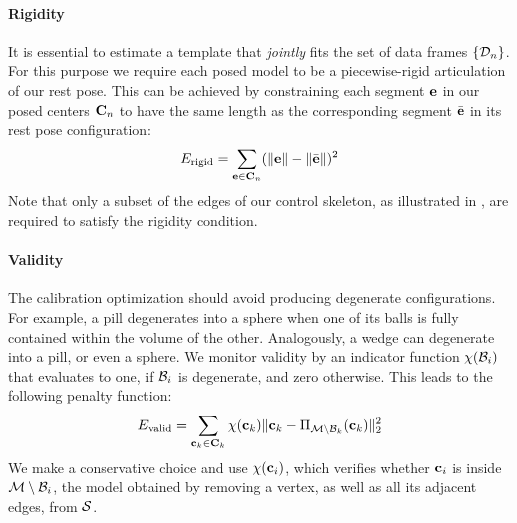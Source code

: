 \paragraph{Rigidity}
It is essential to estimate a template that \emph{jointly} fits the set of data frames $\{ \mathcal{D}_n \}$. For this purpose we require each posed model to be a piecewise-rigid articulation of our rest pose. This can be achieved by constraining each segment $\mathbf{e}$ in our posed centers ${\mathbf{C}}_n$ to have the same length as the corresponding segment $\bar{\mathbf{e}}$ in its rest pose configuration:
% 
\begin{equation}
E_{\text{rigid}} = \sum_{\mathbf{e} \in {\mathbf{C}}_n} (\| \mathbf{e} \| - \| \bar{\mathbf{e}} \|)^2
\end{equation}
% 
Note that only a subset of the edges of our control skeleton, as illustrated in , are required to satisfy the rigidity condition.

\paragraph{Validity}
The calibration optimization should avoid producing degenerate configurations. For example, a pill degenerates into a sphere when one of its balls is fully contained within  the volume of the other. Analogously, a wedge can degenerate into a pill, or even a sphere. We monitor validity by an indicator function $\chi(\mathcal{B}_i)$ that evaluates to one, if $\mathcal{B}_i$ is degenerate, and zero otherwise.
This leads to the following penalty function:
% 
\begin{equation}
E_{\text{valid}} = \sum_{\mathbf{c}_k \in {\mathbf{C}}_k} \chi(\mathbf{c}_k) \| \mathbf{c}_k - \Pi_{\mathcal{M} \setminus \mathcal{B}_k}(\mathbf{c}_k) \|_2^2
\end{equation}
% 
We make a conservative choice and use $\chi(\mathbf{c}_i)$, which verifies whether $\mathbf{c}_i$ is inside $\mathcal{M} \setminus \mathcal{B}_i$, the model obtained by removing a vertex, as well as all its adjacent edges, from $\mathcal{S}$. 
